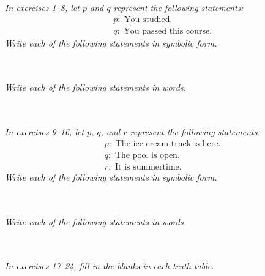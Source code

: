 \begin{exercises}
\textit{In exercises 1--8, let $p$ and $q$ represent the following statements:}
\begin{align*}
&p: \textrm{ You studied.}\\
&q: \textrm{ You passed this course.}
\end{align*}
\textit{Write each of the following statements in symbolic form.}


\\ \\

\textit{Write each of the following statements in words.}

\\ \\

\textit{In exercises 9--16, let $p$, $q$, and $r$ represent the following statements:}
\begin{align*}
&p: \textrm{ The ice cream truck is here.}\\
&q: \textrm{ The pool is open.}\\
&r: \textrm{ It is summertime.}
\end{align*}
\textit{Write each of the following statements in symbolic form.}


\\ \\

\textit{Write each of the following statements in words.}

\\ \\

\textit{In exercises 17--24, fill in the blanks in each truth table.}


\end{exercises}

